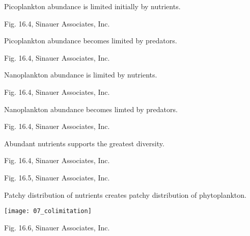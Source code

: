 \documentclass[t]{beamer}
\begin{document}
{
\begin{frame}[b]{Picoplankton abundance is limited initially by nutrients.}

	\hfill \tiny Fig. 16.4, \textcopyright Sinauer Associates, Inc.
\end{frame}
}
%
{
\begin{frame}[b]{Picoplankton abundance becomes limited by predators.}

	\hfill \tiny Fig. 16.4, \textcopyright Sinauer Associates, Inc.
\end{frame}
}
%
{
\begin{frame}[b]{Nanoplankton abundance is limited by nutrients.}

	\hfill \tiny Fig. 16.4, \textcopyright Sinauer Associates, Inc.
\end{frame}
}
%
{
\begin{frame}[b]{Nanoplankton abundance becomes limted by predators.}

	\hfill \tiny Fig. 16.4, \textcopyright Sinauer Associates, Inc.
\end{frame}
}
%

{
\begin{frame}[b]{Abundant nutrients supports the greatest diversity.}

	\hfill \tiny Fig. 16.4, \textcopyright Sinauer Associates, Inc.
\end{frame}
}
%
{
\begin{frame}[b]



	\hfill \tiny Fig. 16.5, \textcopyright Sinauer Associates, Inc.
\end{frame}
}
%
\begin{frame}[t]{Patchy distribution of nutrients creates patchy distribution of phytoplankton.}

	\vspace*{-0.5\baselineskip}
	\begin{center}
		\texttt{[image: 07\_colimitation]}
	\end{center}
	\vfilll
	
	\hfill \tiny Fig. 16.6, \textcopyright Sinauer Associates, Inc.
\end{frame}
\end{document}
